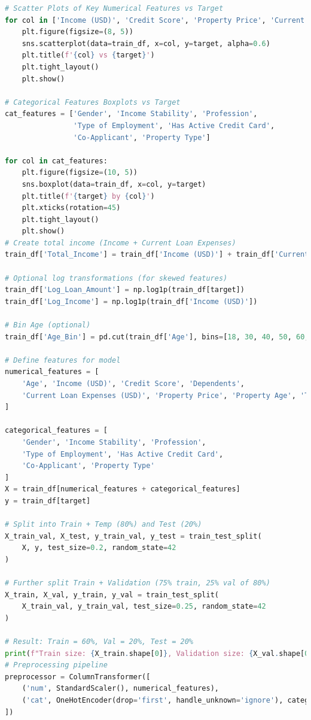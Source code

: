 \documentclass{article}
\begin{document}
\begin{lstlisting}[language=Python, caption=Iris Dataset Classification, basicstyle=\ttfamily\small, breaklines=true]
# Scatter Plots of Key Numerical Features vs Target
for col in ['Income (USD)', 'Credit Score', 'Property Price', 'Current Loan Expenses (USD)']:
    plt.figure(figsize=(8, 5))
    sns.scatterplot(data=train_df, x=col, y=target, alpha=0.6)
    plt.title(f'{col} vs {target}')
    plt.tight_layout()
    plt.show()

# Categorical Features Boxplots vs Target
cat_features = ['Gender', 'Income Stability', 'Profession',
                'Type of Employment', 'Has Active Credit Card',
                'Co-Applicant', 'Property Type']

for col in cat_features:
    plt.figure(figsize=(10, 5))
    sns.boxplot(data=train_df, x=col, y=target)
    plt.title(f'{target} by {col}')
    plt.xticks(rotation=45)
    plt.tight_layout()
    plt.show()
# Create total income (Income + Current Loan Expenses)
train_df['Total_Income'] = train_df['Income (USD)'] + train_df['Current Loan Expenses (USD)']

# Optional log transformations (for skewed features)
train_df['Log_Loan_Amount'] = np.log1p(train_df[target])
train_df['Log_Income'] = np.log1p(train_df['Income (USD)'])

# Bin Age (optional)
train_df['Age_Bin'] = pd.cut(train_df['Age'], bins=[18, 30, 40, 50, 60, 100], labels=False)

# Define features for model
numerical_features = [
    'Age', 'Income (USD)', 'Credit Score', 'Dependents',
    'Current Loan Expenses (USD)', 'Property Price', 'Property Age', 'Total_Income'
]

categorical_features = [
    'Gender', 'Income Stability', 'Profession',
    'Type of Employment', 'Has Active Credit Card',
    'Co-Applicant', 'Property Type'
]
X = train_df[numerical_features + categorical_features]
y = train_df[target]

# Split into Train + Temp (80%) and Test (20%)
X_train_val, X_test, y_train_val, y_test = train_test_split(
    X, y, test_size=0.2, random_state=42
)

# Further split Train + Validation (75% train, 25% val of 80%)
X_train, X_val, y_train, y_val = train_test_split(
    X_train_val, y_train_val, test_size=0.25, random_state=42
)

# Result: Train = 60%, Val = 20%, Test = 20%
print(f"Train size: {X_train.shape[0]}, Validation size: {X_val.shape[0]}, Test size: {X_test.shape[0]}")
# Preprocessing pipeline
preprocessor = ColumnTransformer([
    ('num', StandardScaler(), numerical_features),
    ('cat', OneHotEncoder(drop='first', handle_unknown='ignore'), categorical_features)
])


\end{lstlisting}
\end{document}
